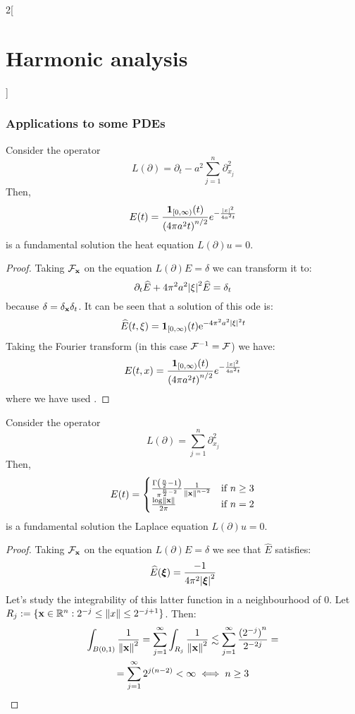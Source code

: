 \documentclass[../../../main_math.tex]{subfiles}
\begin{document}
\begin{multicols}{2}[\section{Harmonic analysis}]
  \subsubsection{Applications to some PDEs}
  \begin{proposition}
    Consider the operator
    $$
      L(\partial)=\partial_t-a^2\sum_{j=1}^{n}\partial_{x_j}^2
    $$
    Then, $$
      E(t)=\frac{\boldsymbol{\mathrm{1}}_{[0,\infty)}(t)}{{(4\pi a^2t)}^{n/2}}e^{-\frac{\abs{x}^2}{4a^2t}}
    $$
    is a fundamental solution the heat equation $L(\partial)u=0$.
  \end{proposition}
  \begin{proof}
    Taking $\mathcal{F}_{\boldsymbol{\mathrm{x}}}$ on the equation $L(\partial) E=\delta$ we can transform it to:
    $$
      \partial_t \widehat{E}+4\pi^2a^2\abs{\xi}^2\widehat{E}=\delta_t
    $$
    because $\delta=\delta_{\boldsymbol{\mathrm{x}}}\delta_t$. It can be seen that a solution of this ode is:
    $$
      \widehat{E}(t,\xi)=\boldsymbol{\mathrm{1}}_{[0,\infty)}(t)\mathrm{e}^{-4\pi^2a^2\abs{\xi}^2t}
    $$
    Taking the Fourier transform (in this case $\mathcal{F}^{-1}=\mathcal{F}$) we have:
    $$
      E(t,x)=\frac{\boldsymbol{\mathrm{1}}_{[0,\infty)}(t)}{{(4\pi a^2t)}^{n/2}}e^{-\frac{\abs{x}^2}{4a^2t}}
    $$
    where we have used .
  \end{proof}
  \begin{proposition}
    Consider the operator
    $$
      L(\partial)=\sum_{j=1}^{n}\partial_{x_j}^2
    $$
    Then, $$
      E(t)=\begin{cases}
        \frac{\Gamma\left(\frac{n}{2}-1\right)}{\pi^{\frac{n}{2}-2}}\frac{1}{\left\|\boldsymbol{\mathrm{x}}\right\|^{n-2}} & \text{if }n\geq 3 \\
        \frac{\log\left\|\boldsymbol{\mathrm{x}}\right\|}{2\pi}                                                            & \text{if }n=2     \\
      \end{cases}
    $$
    is a fundamental solution the Laplace equation $L(\partial)u=0$.
  \end{proposition}
  \begin{proof}
    Taking $\mathcal{F}_{\boldsymbol{\mathrm{x}}}$ on the equation $L(\partial) E=\delta$ we see that $\widehat{E}$ satisfies:
    $$
      \widehat{E}(\boldsymbol{\mathrm{\xi}}) = \frac{-1}{4\pi^2\abs{\boldsymbol{\mathrm{\xi}}}^2}
    $$
    Let's study the integrability of this latter function in a neighbourhood of $0$. Let $R_j:=\{\boldsymbol{\mathrm{x}}\in\mathbb{R}^n:2^{-j}\leq \left\|x\right\|\leq 2^{-j+1}\}$. Then:
    \begin{multline*}
      \int_{B(0,1)}\frac{1}{\norm{\vf{x}}^2}=\sum_{j=1}^{\infty}\int_{R_j} \frac{1}{\norm{\vf{x}}^2}\lesssim \sum_{j=1}^{\infty}\frac{{(2^{-j})}^n}{2^{-2j}}=\\= \sum_{j=1}^{\infty}2^{j(n-2)}<\infty\iff n\geq 3

\end{multline*}
\end{proof}
\end{multicols}
\end{document}
